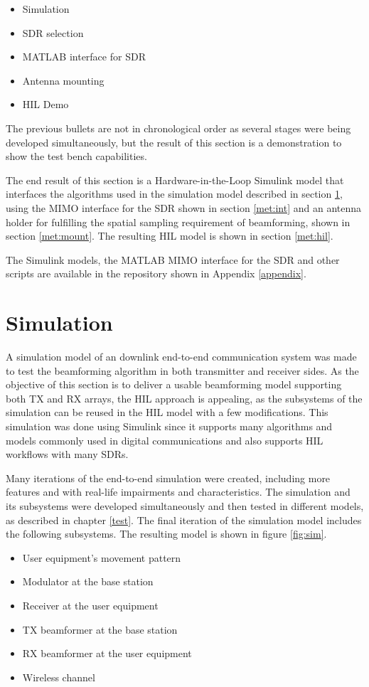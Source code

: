 \documentclass[12pt,a4paper]{report}
\begin{document}
\begin{itemize}
    \item Simulation
    \item SDR selection
    \item MATLAB interface for SDR
    \item Antenna mounting
    \item HIL Demo
\end{itemize}

The previous bullets are not in chronological order as several stages were being developed simultaneously, but the result of this section is a demonstration to show the test bench capabilities.

The end result of this section is a Hardware-in-the-Loop Simulink model that interfaces the algorithms used in the simulation model described in section \ref{met:sim}, using the MIMO interface for the SDR shown in section \ref{met:int} and an antenna holder for fulfilling the spatial sampling requirement of beamforming, shown in section \ref{met:mount}. The resulting HIL model is shown in section \ref{met:hil}.

The Simulink models, the MATLAB MIMO interface for the SDR and other scripts are available in the repository shown in Appendix \ref{appendix}.

\newpage
\section{Simulation} \label{met:sim}
A simulation model of an downlink end-to-end communication system was made to test the beamforming algorithm in both transmitter and receiver sides. As the objective of this section is to deliver a usable beamforming model supporting both TX and RX arrays, the HIL approach is appealing, as the subsystems of the simulation can be reused in the HIL model with a few modifications. This simulation was done using Simulink since it supports many algorithms and models commonly used in digital communications and also supports HIL workflows with many SDRs.

Many iterations of the end-to-end simulation were created, including more features and with real-life impairments and characteristics. The simulation and its subsystems were developed simultaneously and then tested in different models, as described in chapter \ref{test}. The final iteration of the simulation model includes the following subsystems. The resulting model is shown in figure \ref{fig:sim}.

\begin{multicols}{2}
\begin{itemize}
    \item User equipment's movement pattern
    \item Modulator at the base station
    \item Receiver at the user equipment
    \item TX beamformer at the base station
    \item RX beamformer at the user equipment
    \item Wireless channel
\end{itemize}
\end{multicols}
\end{document}
